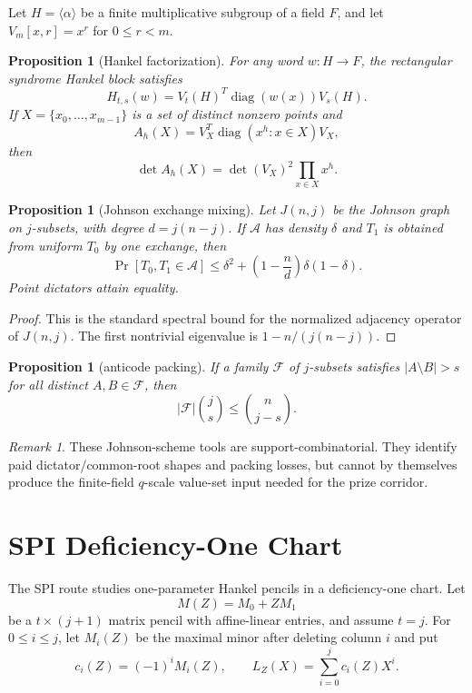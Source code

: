 \documentclass[11pt]{article}
\newtheorem{proposition}[theorem]{Proposition}
\theoremstyle{definition}
\theoremstyle{remark}
\newtheorem{remark}[theorem]{Remark}
\begin{document}
Let $H=\langle\alpha\rangle$ be a finite multiplicative subgroup of a field
$F$, and let $V_m[x,r]=x^r$ for $0\le r<m$.

\begin{proposition}[Hankel factorization]\label{prop:hankel}
For any word $w:H\to F$, the rectangular syndrome Hankel block satisfies
\[
        H_{t,s}(w)=V_t(H)^T\operatorname{diag}(w(x))V_s(H).
\]
If $X=\{x_0,\ldots,x_{m-1}\}$ is a set of distinct nonzero points and
\[
        A_h(X)=V_X^T\operatorname{diag}(x^h:x\in X)V_X,
\]
then
\[
        \det A_h(X)=\det(V_X)^2\prod_{x\in X}x^h.
\]
\end{proposition}

\begin{proposition}[Johnson exchange mixing]\label{prop:johnson}
Let $J(n,j)$ be the Johnson graph on $j$-subsets, with degree
$d=j(n-j)$.  If $\mathcal A$ has density $\delta$ and $T_1$ is obtained from
uniform $T_0$ by one exchange, then
\[
        \Pr[T_0,T_1\in\mathcal A]
        \le
        \delta^2+\left(1-\frac{n}{d}\right)\delta(1-\delta).
\]
Point dictators attain equality.
\end{proposition}

\begin{proof}
This is the standard spectral bound for the normalized adjacency operator of
$J(n,j)$.  The first nontrivial eigenvalue is $1-n/(j(n-j))$.
\end{proof}

\begin{proposition}[anticode packing]\label{prop:anticode}
If a family $\mathcal F$ of $j$-subsets satisfies $|A\setminus B|>s$ for all
distinct $A,B\in\mathcal F$, then
\[
        |\mathcal F|\binom js\le \binom n{j-s}.
\]
\end{proposition}

\begin{remark}
These Johnson-scheme tools are support-combinatorial.  They identify paid
dictator/common-root shapes and packing losses, but cannot by themselves
produce the finite-field $q$-scale value-set input needed for the prize
corridor.
\end{remark}

\section{SPI Deficiency-One Chart}

The SPI route studies one-parameter Hankel pencils in a deficiency-one chart.
Let
\[
        M(Z)=M_0+Z M_1
\]
be a $t\times(j+1)$ matrix pencil with affine-linear entries, and assume
$t=j$.  For $0\le i\le j$, let $M_i(Z)$ be the maximal minor after deleting
column $i$ and put
\[
        c_i(Z)=(-1)^iM_i(Z),\qquad
        L_Z(X)=\sum_{i=0}^{j}c_i(Z)X^i.
\]
\end{document}
